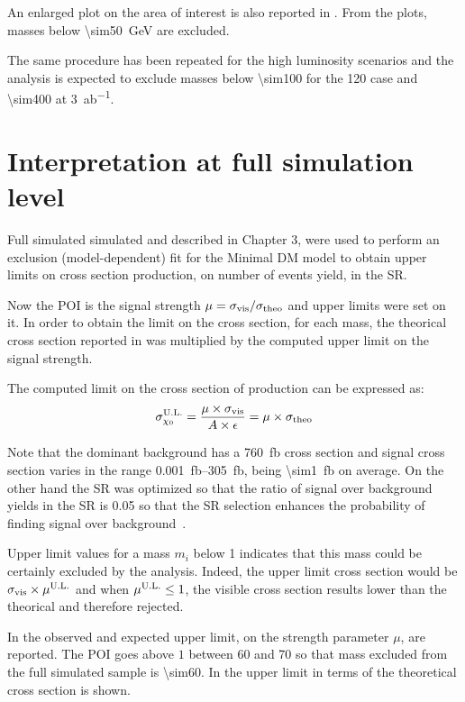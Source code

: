 An enlarged plot on the area of interest is also reported in  \Fig{\ref{subfig:exclMIZ}}. From the plots, \chizero masses below \SI{\sim50}{\GeV} are excluded.

The same procedure has been repeated for the high luminosity scenarios and the analysis is expected to exclude masses below \SI{\sim100}{\gev} for the \SI{120}{\ifb} case and \SI{\sim400}{\gev} at \SI{3}{ab^{-1}}. 

\section{Interpretation at full simulation level}
\label{sec:full}
Full simulated simulated and described in Chapter 3, were used to perform an exclusion (model-dependent) fit for the Minimal DM model to obtain upper limits on \chizero cross section production, on number of events yield, in the SR.

Now the POI is the signal strength $\mu=\sigma_\textup{{vis}}/\sigma_{\textup{theo}}$ and upper limits were set on it. In order to obtain the limit on the cross section, for each mass, the theorical cross section reported in \Tab{\ref{tab:eff}} was multiplied by the computed upper limit on the signal strength. 

The computed limit on the cross section of \chizero production can be expressed as:
\begin{equation}
	\sigma_{\chi_0}^\textup{U.L.}=\frac{\mu\times\sigma_\textup{vis}}{A\times\epsilon}=\mu\times\sigma_\textup{theo}
\end{equation}

Note that the dominant background \znng has a \SI{760}{fb} cross section and signal cross section varies in the range \SIrange{0.001}{305}{fb}, being \SI{\sim1}{fb} on average. On the other hand the SR was optimized so that the ratio of signal over background yields in the SR is \num{0.05} so that the SR selection enhances the probability of finding signal over background~\cite{mgiulia}.

Upper limit values for a mass $m_i$ below \num{1} indicates that this mass could be certainly excluded by the analysis. Indeed, the upper limit cross section would be $\sigma_\textup{vis}\times \mu^\textup{U.L.}$ and when $\mu^\textup{U.L.} \le 1$, the visible cross section results lower than the theorical and therefore rejected.

In \Tab{\ref{tab:mu}} the observed and expected upper limit, on the strength parameter $\mu$, are reported. The POI goes above $1$ between \SI{60}{\gev} and \SI{70}{\gev} so that mass excluded from the full simulated sample is \SI{\sim60}{\gev}. In \Fig{\ref{fig:exclMD}} the upper limit in terms of the theoretical cross section is shown. 

